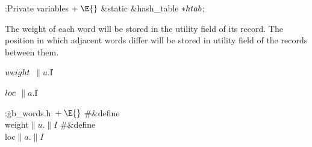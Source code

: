 \B{}:Private variables\X${}\mathrel+\E{}$\6
\&{static} \&{hash\_table} ${}{*}\\{htab}{}$;\par
\fi

The weight of each word will be stored in the utility field  of its
 record. The position in which adjacent words differ will be
stored in utility field  of the  records between
them.

\Y\B\4\D$\\{weight}$ \5
$\|u.{}$\|I\par
\B\4\D$\\{loc}$ \5
$\|a.{}$\|I\par
\Y\B\4:\.{gb\_words.h\,}\X${}\mathrel+\E{}$\6
\8\#\&{define} \\{weight}\5${}\|u.\|I{}$\6
\8\#\&{define} \\{loc}\5${}\|a.\|I{}$\par
\fi

